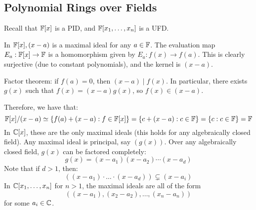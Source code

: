 \subsection{Polynomial Rings over Fields}
Recall that $ \mathbb{F}[x] $ is a PID, and $ \mathbb{F}[x_{1}, \dots, x_{n}] $ is a UFD.

In $ \mathbb{F}[x], (x-a) $ is a maximal ideal for any $ a \in \mathbb{F} $.
The evaluation map $ E_{a}: \mathbb{F}[x] \rightarrow \mathbb{F} $ is a homomorphism
given by $ E_{a}: f(x) \rightarrow f(a) $.
This is clearly surjective (due to constant polynomials), and the kernel is $ (x-a) $.
\begin{lm}
    Factor theorem: if $ f(a) = 0 $, then $ (x-a) \mid f(x) $. In particular,
    there exists $ g(x) $ such that $ f(x) = (x-a)g(x) $, so $ f(x) \in (x-a) $.
\end{lm}
Therefore, we have that:
\begin{equation*}
    \mathbb{F}[x]/(x-a) \simeq \left\{{f(a) + (x-a) : f \in \mathbb{F}[x]}\right\}
    = \left\{{c + (x-a) : c \in \mathbb{F}}\right\} = \left\{{c : c \in \mathbb{F}}\right\} = \mathbb{F}
\end{equation*}
In $ \mathbb{C}[x] $, these are the only maximal ideals (this holds for any algebraically closed field).
Any maximal ideal is principal, say $ (g(x)) $. Over any algebraically closed field, $ g(x) $ can be
factored completely:
\begin{equation*}
    g(x) = (x-a_{1})(x-a_{2})\cdots(x-a_{d})
\end{equation*}
Note that if $ d > 1 $, then:
\begin{equation*}
    ( (x-a_{1})\cdot\dots\cdot(x-a_{d})) \subsetneq (x-a_{i})
\end{equation*}
In $ \mathbb{C}[x_{1},\dots,x_{n}] $ for $ n > 1 $, the maximal ideals are all of the form
\begin{equation*}
    ( (x-a_{1}),(x_{2}-a_{2}),\dots,(x_{n}-a_{n}))
\end{equation*}
for some $ a_{i} \in \mathbb{C} $.

